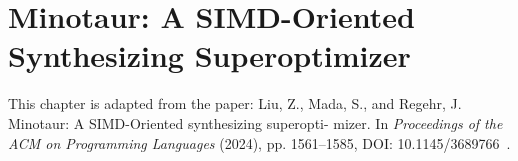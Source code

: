 \chapter{Minotaur: A SIMD-Oriented Synthesizing Superoptimizer}
\label{chap:minotaur}

This chapter is adapted from the paper:
Liu, Z., Mada, S., and
Regehr, J. Minotaur: A SIMD-Oriented synthesizing superopti- mizer. In
\textit{Proceedings of the ACM on Programming Languages} (2024), pp.
1561–1585, DOI: 10.1145/3689766~\cite{minotaur}.







